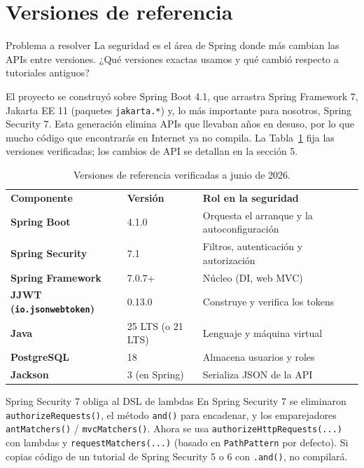 \documentclass[11pt]{article}
\begin{document}
\section{Versiones de referencia}
\begin{cajaproblema}{Problema a resolver}
La seguridad es el área de Spring donde más cambian las APIs entre versiones. ¿Qué versiones exactas usamos y qué cambió respecto a tutoriales antiguos?\par
\end{cajaproblema}
El proyecto se construyó sobre Spring Boot 4.1, que arrastra Spring Framework 7, Jakarta EE 11 (paquetes \texttt{jakarta.*}) y, lo más importante para nosotros, Spring Security 7. Esta generación elimina APIs que llevaban años en desuso, por lo que mucho código que encontrarás en Internet ya no compila. La Tabla~\ref{tab:versiones} fija las versiones verificadas; los cambios de API se detallan en la sección 5.

\begin{table}[h]
\centering
\caption{Versiones de referencia verificadas a junio de 2026.}
\label{tab:versiones}
\renewcommand{\arraystretch}{1.25}
\begin{tabular}{>{\bfseries}p{4.2cm} p{4.0cm} p{5.4cm}}
\rowcolor{jwebazul!12}
\textnormal{\textbf{Componente}} & \textbf{Versión} & \textbf{Rol en la seguridad} \\
Spring Boot & 4.1.0 & Orquesta el arranque y la autoconfiguración \\
Spring Security & 7.1 & Filtros, autenticación y autorización \\
Spring Framework & 7.0.7+ & Núcleo (DI, web MVC) \\
JJWT (\texttt{io.jsonwebtoken}) & 0.13.0 & Construye y verifica los tokens \\
Java & 25 LTS (o 21 LTS) & Lenguaje y máquina virtual \\
PostgreSQL & 18 & Almacena usuarios y roles \\
Jackson & 3 (en Spring) & Serializa JSON de la API \\
\end{tabular}
\end{table}

\begin{cajawarn}{Spring Security 7 obliga al DSL de lambdas}
En Spring Security 7 se eliminaron \texttt{authorizeRequests()}, el método \texttt{and()} para encadenar, y los emparejadores \texttt{antMatchers()} / \texttt{mvcMatchers()}. Ahora se usa \texttt{authorizeHttpRequests(...)} con lambdas y \texttt{requestMatchers(...)} (basado en \texttt{PathPattern} por defecto). Si copias código de un tutorial de Spring Security 5 o 6 con \texttt{.and()}, no compilará.\par
\end{cajawarn}
\end{document}
